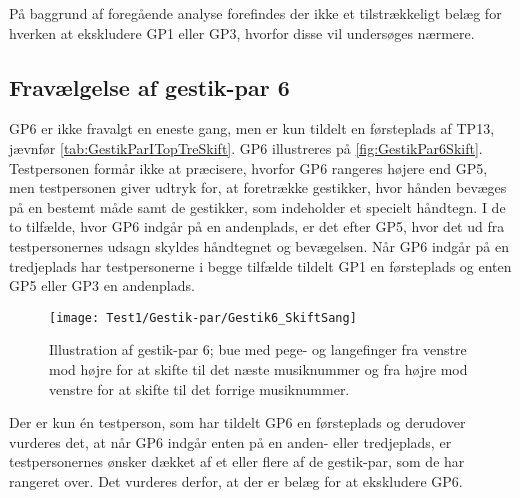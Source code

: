På baggrund af foregående analyse forefindes der ikke et tilstrækkeligt belæg for hverken at ekskludere GP1 eller GP3, hvorfor disse vil undersøges nærmere.
%
\subsection{Fravælgelse af gestik-par 6}
\label{app:TestresultaterFravalgtGP6}
%
GP6 er ikke fravalgt en eneste gang, men er kun tildelt en førsteplads af TP13, jævnfør \autoref{tab:GestikParITopTreSkift}. GP6 illustreres på \autoref{fig:GestikPar6Skift}. Testpersonen formår ikke at præcisere, hvorfor GP6 rangeres højere end GP5, men testpersonen giver udtryk for, at foretrække gestikker, hvor hånden bevæges på en bestemt måde samt de gestikker, som indeholder et specielt håndtegn. I de to tilfælde, hvor GP6 indgår på en andenplads, er det efter GP5, hvor det ud fra testpersonernes udsagn skyldes håndtegnet og bevægelsen. Når GP6 indgår på en tredjeplads har testpersonerne i begge tilfælde tildelt GP1 en førsteplads og enten GP5 eller GP3 en andenplads.
\newpage 
%
\begin{figure}[H]
	\centering
	\texttt{[image: Test1/Gestik-par/Gestik6\_SkiftSang]}
	\caption{Illustration af gestik-par 6; bue med pege- og langefinger fra venstre mod højre for at skifte til det næste musiknummer og fra højre mod venstre for at skifte til det forrige musiknummer.}
	\label{fig:GestikPar6Skift}
\end{figure}
\noindent
%                
Der er kun én testperson, som har tildelt GP6 en førsteplads og derudover vurderes det, at når GP6 indgår enten på en anden- eller tredjeplads, er testpersonernes ønsker dækket af et eller flere af de gestik-par, som de har rangeret over. Det vurderes derfor, at der er belæg for at ekskludere GP6.
%
